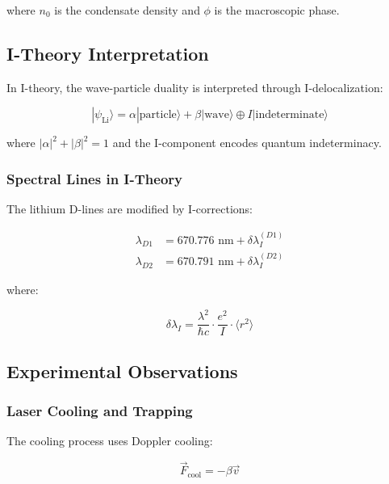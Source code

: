 where $n_0$ is the condensate density and $\phi$ is the macroscopic phase.

\subsection{I-Theory Interpretation}

In I-theory, the wave-particle duality is interpreted through I-delocalization:

\begin{equation}
\label{eq:i_delocalization}
|\psi_{\text{Li}}\rangle = \alpha |\text{particle}\rangle + \beta |\text{wave}\rangle \oplus I|\text{indeterminate}\rangle
\end{equation}

where $|\alpha|^2 + |\beta|^2 = 1$ and the I-component encodes quantum indeterminacy.

\subsubsection{Spectral Lines in I-Theory}

The lithium D-lines are modified by I-corrections:

\begin{align}
\label{eq:d1_line}
\lambda_{D1} &= 670.776 \text{ nm} + \delta\lambda_I^{(D1)} \\
\label{eq:d2_line}
\lambda_{D2} &= 670.791 \text{ nm} + \delta\lambda_I^{(D2)}
\end{align}

where:

\begin{equation}
\label{eq:i_wavelength_correction}
\delta\lambda_I = \frac{\lambda^2}{\hbar c} \cdot \frac{e^2}{I} \cdot \langle r^2 \rangle
\end{equation}

\subsection{Experimental Observations}

\subsubsection{Laser Cooling and Trapping}

The cooling process uses Doppler cooling:

\begin{equation}
\label{eq:doppler_cooling}
\vec{F}_{\text{cool}} = -\beta \vec{v}
\end{equation}

